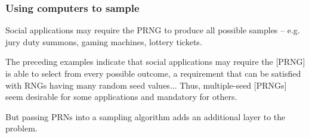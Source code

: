 \documentclass{beamer}
\newcommand{\todo}[1]{{\color{red}{TO DO: \sc #1}}}
\begin{document}


\begin{frame}
\frametitle{Using computers to sample}

Social applications may require the PRNG to produce all possible samples -- e.g. jury duty summons, gaming machines, lottery tickets.

\vspace{10pt}
\begin{block}{\cite{marsaglia_seeds_2003}}
The preceding examples indicate that social applications may require the [PRNG] is able to select from every possible outcome, a requirement that can be satisfied with RNGs having many random seed values... Thus, multiple-seed [PRNGs] seem desirable for some applications and mandatory for others.
\end{block}

\vspace{10pt}
But passing PRNs into a sampling algorithm adds an additional layer to the problem.

\end{frame}
\end{document}
